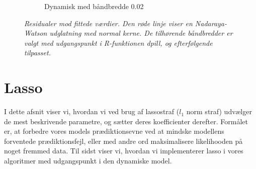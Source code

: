 \documentclass[11pt,a4paper]{article}
\begin{document}
\begin{figure}[h!]
\begin{subfigure}[b]{0.425\linewidth}
    \caption{Dynamisk med båndbredde 0.02}
    \label{fig:ResDU}
  \end{subfigure}
  \caption{\textit{Residualer mod fittede værdier. Den røde linje viser en Nadaraya-Watson udglatning med normal kerne. De tilhørende båndbredder er valgt med udgangspunkt i R-funktionen dpill, og efterfølgende tilpasset.}}
  \label{fig:residualplot}
\end{figure}
\clearpage
\section{Lasso}
I dette afsnit viser vi, hvordan vi ved brug af lassostraf ($l_1$ norm straf) udvælger de mest beskrivende parametre, og sætter deres koefficienter derefter. Formålet er, at forbedre vores models prædiktionsevne ved at mindske modellens forventede prædiktionsfejl, eller med andre ord maksimalisere likelihooden på noget fremmed data. Til sidst viser vi, hvordan vi implementerer lasso i vores algoritmer med udgangspunkt i den dynamiske model.\\\\
\end{document}
